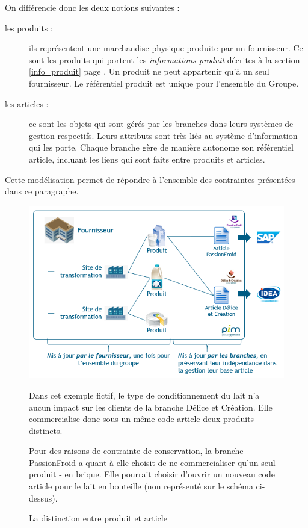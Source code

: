             On différencie donc les deux notions suivantes : 
            \begin{description}
                \item[les produits :] ils représentent une marchandise physique produite par un fournisseur. Ce sont les produits qui portent les \emph{informations produit} décrites à la section \ref{info_produit} page \pageref{info_produit}. Un produit ne peut appartenir qu'à un seul fournisseur. Le référentiel produit est unique pour l'ensemble du Groupe.
                \item[les articles :] ce sont les objets qui sont gérés par les branches dans leurs systèmes de gestion respectifs. Leurs attributs sont très liés au système d'information qui les porte. Chaque branche gère de manière autonome son référentiel article, incluant les liens qui sont faits entre produits et articles.
            \end{description}
            Cette modélisation permet de répondre à l'ensemble des contraintes présentées dans ce paragraphe.

            \begin{figure}[htbp]
                \begin{center}
                \includegraphics[width=\linewidth]{img/Produit article.png}
                \end{center}
                Dans cet exemple fictif, le type de conditionnement du lait n'a aucun impact sur les clients de la branche Délice et Création. Elle commercialise donc sous un même code article deux produits distincts.

                Pour des raisons de contrainte de conservation, la branche PassionFroid a quant à elle choisit de ne commercialiser qu'un seul produit - en brique. Elle pourrait choisir d'ouvrir un nouveau code article pour le lait en bouteille (non représenté sur le schéma ci-dessus).
                \caption{La distinction entre produit et article}
                \label{fig:produit_article}
            \end{figure}          


